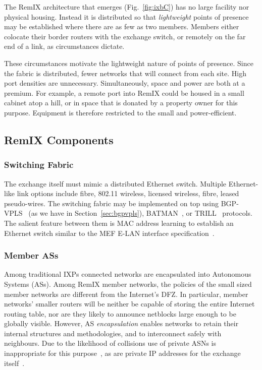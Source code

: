 The RemIX architecture that emerges (Fig.~\ref{fig:ixbC}) has no large
facility nor physical housing. Instead it is distributed so that
\emph{lightweight} points of presence may be established where there
are as few as two members. Members either colocate their border
routers with the exchange switch, or remotely on the far end of a
link, as circumstances dictate.

These circumstances motivate the lightweight nature of points of
presence. Since the fabric is distributed, fewer networks that will
connect from each site. High port densities are unnecessary.
Simultaneously, space and power are both at a premium. For example, a
remote port into RemIX could be housed in a small cabinet atop a hill,
or in space that is donated by a property owner for this purpose.
Equipment is therefore restricted to the small and power-efficient.


\subsection{RemIX Components}

\subsubsection{Switching Fabric}

The exchange itself must mimic a distributed Ethernet switch. Multiple
Ethernet-like link options include fibre, 802.11 wireless, licensed wireless, fibre, leased pseudo-wires. The switching fabric may be implemented on
top using \acs{BGP}-\acs{VPLS}~\cite{rfc4761} (as we have in
Section~\ref{sec:bgpvpls}),
\acs{BATMAN}~\cite{johnson2008simple}, or
\acs{TRILL}~\cite{perlman2004rbridges} protocols. The salient feature
between them is MAC address learning to establish an Ethernet switch
similar to the \ac{MEF} E-LAN interface
specification~\cite{mef62}.%

\subsubsection{Member \acp{AS}}

Among traditional \acp{IXP} connected networks are encapsulated into
Autonomous Systems (\acp{AS}). Among RemIX member networks, the
policies of the small sized member networks are
different from the Internet's \ac{DFZ}. In particular, member
networks' smaller routers will be neither be capable of storing the
entire Internet routing table, nor are they likely to announce
netblocks large enough to be globally visible.  However, \ac{AS}
\emph{encapsulation} enables networks to retain their internal
structures and methodologies, and to interconnect safely  with
neighbours. Due to the likelihood of collisions use of private
\acp{ASN} is inappropriate for this purpose~\cite{rfc6996}, as are
private IP addresses for the exchange itself~\cite{rfc1918}.

